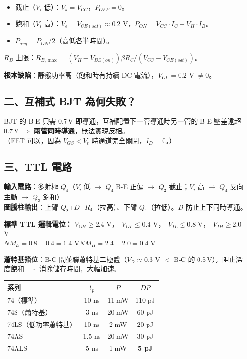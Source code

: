 \documentclass[10pt]{article}
\begin{document}
\begin{itemize}[leftmargin=2em,itemsep=0pt,topsep=2pt]
\item 截止（$V_i$ 低）：$V_o = V_{CC}$，$P_{OFF}=0$。
\item 飽和（$V_i$ 高）：$V_o = V_{CE(sat)} \approx 0.2$ V，$P_{ON} = V_{CC} \cdot I_C + V_H \cdot I_B$。
\item $P_{avg} = P_{ON}/2$（高低各半時間）。
\end{itemize}

$R_B$ 上限：$R_{B,\max} = (V_H - V_{BE(on)})\beta R_C / (V_{CC} - V_{CE(sat)})$。

\textbf{根本缺陷}：靜態功率高（飽和時有持續 DC 電流），$V_{OL} = 0.2$ V $\neq 0$。

\subsection*{二、互補式 BJT 為何失敗？}

BJT 的 B-E 只需 0.7\,V 即導通，互補配置下一管導通時另一管的 B-E 壓差遠超 0.7\,V $\Rightarrow$ \textbf{兩管同時導通}，無法實現反相。\\
（FET 可以，因為 $V_{GS} < V_t$ 時通道完全關閉，$I_D = 0$。）

\subsection*{三、TTL 電路}

\begin{tipbox}
\textbf{輸入電路}：多射極 $Q_4$（$V_i$ 低 $\to$ $Q_4$ B-E 正偏 $\to$ $Q_3$ 截止；$V_i$ 高 $\to$ $Q_4$ 反向主動 $\to$ $Q_3$ 飽和）\\
\textbf{圖騰柱輸出}：上臂 $Q_2$+$D$+$R_4$（拉高）、下臂 $Q_1$（拉低）。$D$ 防止上下同時導通。
\end{tipbox}

\begin{formulabox}
\textbf{標準 TTL 邏輯電位：}\quad
$V_{OH}\ge2.4$ V，\ $V_{OL}\le0.4$ V，\ $V_{IL}\le0.8$ V，\ $V_{IH}\ge2.0$ V\\[3pt]
$NM_L = 0.8-0.4 = 0.4$ V\qquad $NM_H = 2.4-2.0 = 0.4$ V
\end{formulabox}

\textbf{蕭特基箝位}：B-C 間並聯蕭特基二極體（$V_D \approx 0.3$ V $<$ B-C 的 0.5\,V），阻止深度飽和 $\Rightarrow$ 消除儲存時間，大幅加速。

\begin{formulabox}
\renewcommand{\arraystretch}{1.2}
\begin{tabular}{@{}l c c c@{}}
\textbf{系列} & $t_p$ & $P$ & $DP$ \\
\midrule
74（標準） & 10 ns & 11 mW & 110 pJ \\
74S（蕭特基） & 3 ns & 20 mW & 60 pJ \\
74LS（低功率蕭特基） & 10 ns & 2 mW & 20 pJ \\
74AS & 1.5 ns & 20 mW & 30 pJ \\
74ALS & 5 ns & 1 mW & \textbf{5 pJ}
\end{tabular}
\end{formulabox}
\end{document}
